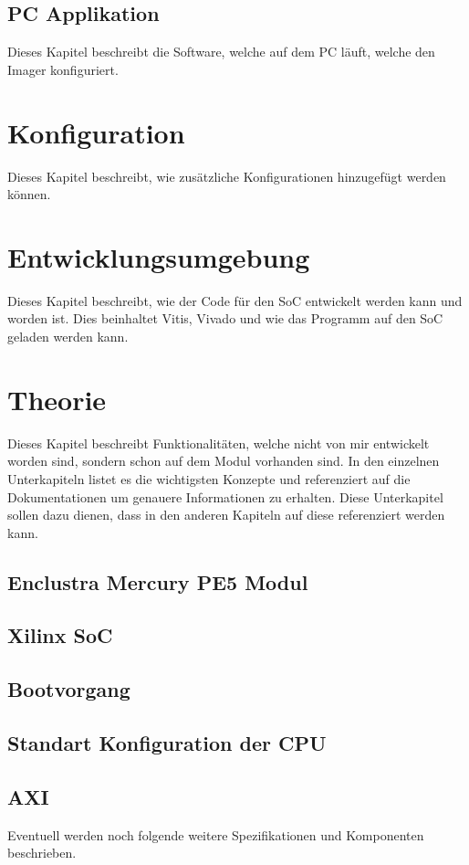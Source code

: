 \documentclass{article}
\begin{document}
\subsection{PC Applikation}
Dieses Kapitel beschreibt die Software, welche auf dem PC läuft, welche den Imager konfiguriert.


\section{Konfiguration}
Dieses Kapitel beschreibt, wie zusätzliche Konfigurationen hinzugefügt werden können.

\section{Entwicklungsumgebung}
Dieses Kapitel beschreibt, wie der Code für den SoC entwickelt werden kann und worden ist. Dies beinhaltet Vitis, Vivado und wie das Programm auf den SoC geladen werden kann.

\section{Theorie}
Dieses Kapitel beschreibt Funktionalitäten, welche nicht von mir entwickelt worden sind, sondern schon auf dem Modul vorhanden sind. In den einzelnen Unterkapiteln listet es die wichtigsten Konzepte und referenziert auf die Dokumentationen um genauere Informationen zu erhalten. Diese Unterkapitel sollen dazu dienen, dass in den anderen Kapiteln auf diese referenziert werden kann.
\subsection{Enclustra Mercury PE5 Modul}
\subsection{Xilinx SoC}
\subsection{Bootvorgang}
\subsection{Standart Konfiguration der CPU}
\subsection{AXI}

Eventuell werden noch folgende weitere Spezifikationen und Komponenten be\-schrieben.
\end{document}
